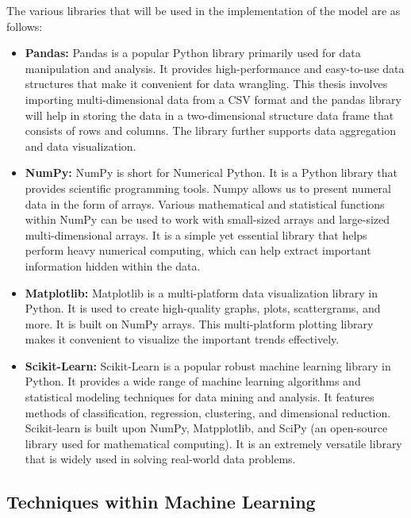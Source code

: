 The various libraries that will be used in the implementation of the model are as follows: 
\begin{itemize}
\item \textbf{Pandas:} Pandas is a popular Python library primarily used for data manipulation and analysis. It provides high-performance and easy-to-use data structures that make it convenient for data wrangling. This thesis involves importing multi-dimensional data from a CSV format and the pandas library will help in storing the data in a two-dimensional structure data frame that consists of rows and columns. The library further supports data aggregation and data visualization.

\item \textbf{NumPy:} NumPy is short for Numerical Python. It is a Python library that provides scientific programming tools. Numpy allows us to present numeral data in the form of arrays. Various mathematical and statistical functions within NumPy can be used to work with small-sized arrays and large-sized multi-dimensional arrays. It is a simple yet essential library that helps perform heavy numerical computing, which can help extract important information hidden within the data.

\item \textbf{Matplotlib:} Matplotlib is a multi-platform data visualization library in Python. It is used to create high-quality graphs, plots, scattergrams, and more. It is built on NumPy arrays. This multi-platform plotting library makes it convenient to visualize the important trends effectively.

\item \textbf{Scikit-Learn:} Scikit-Learn is a popular robust machine learning library in Python. It provides a wide range of machine learning algorithms and statistical modeling techniques for data mining and analysis. It features methods of classification, regression, clustering, and dimensional reduction. Scikit-learn is built upon NumPy, Matpplotlib, and SciPy (an open-source library used for mathematical computing). It is an extremely versatile library that is widely used in solving real-world data problems.

\end{itemize}



\vspace{150pt}

\subsection{Techniques within Machine Learning}

